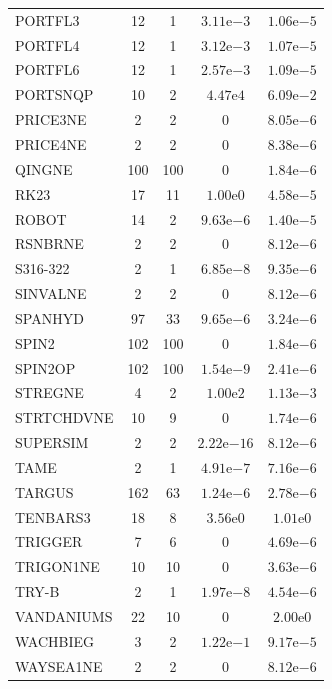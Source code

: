 \documentclass[11pt]{article}
\begin{document}
\begin{center}
\begin{longtable}{lcccc}
PORTFL3 & 12 & 1 & $3.11\mathrm{e}{-3}$ & $1.06\mathrm{e}{-5}$\\
PORTFL4 & 12 & 1 & $3.12\mathrm{e}{-3}$ & $1.07\mathrm{e}{-5}$\\
PORTFL6 & 12 & 1 & $2.57\mathrm{e}{-3}$ & $1.09\mathrm{e}{-5}$\\
PORTSNQP & 10 & 2 & $4.47\mathrm{e}{4}$ & $6.09\mathrm{e}{-2}$\\
PRICE3NE & 2 & 2 & $0$ & $8.05\mathrm{e}{-6}$\\
PRICE4NE & 2 & 2 & $0$ & $8.38\mathrm{e}{-6}$\\
QINGNE & 100 & 100 & $0$ & $1.84\mathrm{e}{-6}$\\
RK23 & 17 & 11 & $1.00\mathrm{e}{0}$ & $4.58\mathrm{e}{-5}$\\
ROBOT & 14 & 2 & $9.63\mathrm{e}{-6}$ & $1.40\mathrm{e}{-5}$\\
RSNBRNE & 2 & 2 & $0$ & $8.12\mathrm{e}{-6}$\\
S316-322 & 2 & 1 & $6.85\mathrm{e}{-8}$ & $9.35\mathrm{e}{-6}$\\
SINVALNE & 2 & 2 & $0$ & $8.12\mathrm{e}{-6}$\\
SPANHYD & 97 & 33 & $9.65\mathrm{e}{-6}$ & $3.24\mathrm{e}{-6}$\\
SPIN2 & 102 & 100 & $0$ & $1.84\mathrm{e}{-6}$\\
SPIN2OP & 102 & 100 & $1.54\mathrm{e}{-9}$ & $2.41\mathrm{e}{-6}$\\
STREGNE & 4 & 2 & $1.00\mathrm{e}{2}$ & $1.13\mathrm{e}{-3}$\\
STRTCHDVNE & 10 & 9 & $0$ & $1.74\mathrm{e}{-6}$\\
SUPERSIM & 2 & 2 & $2.22\mathrm{e}{-16}$ & $8.12\mathrm{e}{-6}$\\
TAME & 2 & 1 & $4.91\mathrm{e}{-7}$ & $7.16\mathrm{e}{-6}$\\
TARGUS & 162 & 63 & $1.24\mathrm{e}{-6}$ & $2.78\mathrm{e}{-6}$\\
TENBARS3 & 18 & 8 & $3.56\mathrm{e}{0}$ & $1.01\mathrm{e}{0}$\\
TRIGGER & 7 & 6 & $0$ & $4.69\mathrm{e}{-6}$\\
TRIGON1NE & 10 & 10 & $0$ & $3.63\mathrm{e}{-6}$\\
TRY-B & 2 & 1 & $1.97\mathrm{e}{-8}$ & $4.54\mathrm{e}{-6}$\\
VANDANIUMS & 22 & 10 & $0$ & $2.00\mathrm{e}{0}$\\
WACHBIEG & 3 & 2 & $1.22\mathrm{e}{-1}$ & $9.17\mathrm{e}{-5}$\\
WAYSEA1NE & 2 & 2 & $0$ & $8.12\mathrm{e}{-6}$\\

\end{longtable}
\end{center}
\end{document}
